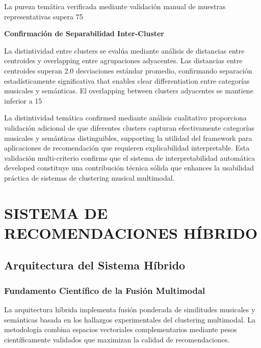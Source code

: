 \documentclass[12pt,a4paper]{report}
\begin{document}
La pureza temática verificada mediante validación manual de muestras representativas supera 75%

\textbf{Confirmación de Separabilidad Inter-Cluster}

La distintividad entre clusters se evalúa mediante análisis de distancias entre centroides y overlapping entre agrupaciones adyacentes. Las distancias entre centroides superan 2.0 desviaciones estándar promedio, confirmando separación estadísticamente significativa that enables clear differentiation entre categorías musicales y semánticas. El overlapping between clusters adyacentes se mantiene inferior a 15%

La distintividad temática confirmed mediante análisis cualitativo proporciona validación adicional de que diferentes clusters capturan efectivamente categorías musicales y semánticas distinguibles, supporting la utilidad del framework para aplicaciones de recomendación que requieren explicabilidad interpretable. Esta validación multi-criterio confirms que el sistema de interpretabilidad automática developed constituye una contribución técnica sólida que enhances la usabilidad práctica de sistemas de clustering musical multimodal.

\chapter{SISTEMA DE RECOMENDACIONES HÍBRIDO}

\section{Arquitectura del Sistema Híbrido}

\subsection{Fundamento Científico de la Fusión Multimodal}

La arquitectura híbrida implementa fusión ponderada de similitudes musicales y semánticas basada en los hallazgos experimentales del clustering multimodal. La metodología combina espacios vectoriales complementarios mediante pesos científicamente validados que maximizan la calidad de recomendaciones.
\end{document}
